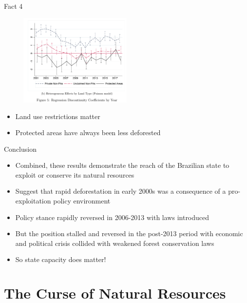 \documentclass[11pt,notes=hide,aspectratio=169,mathserif]{beamer}
\begin{document}
\begin{frame}{Fact 4}
\begin{figure}
\centering
\includegraphics[width=0.5\textwidth]{../TA9/inputs/fig_land_use.png}
\end{figure}
\begin{itemize}
\item Land use restrictions matter 
\item Protected areas have always been less deforested
\end{itemize}
\end{frame}

\begin{frame}{Conclusion}
\begin{itemize}
\item Combined, these results demonstrate the reach of the Brazilian state to exploit or conserve its natural resources
\item Suggest that rapid deforestation in early 2000s was a consequence of a pro-exploitation policy environment 
\item Policy stance rapidly reversed in 2006-2013 with laws introduced 
\item But the position stalled and reversed in the post-2013 period with economic and political crisis collided with weakened forest conservation laws 
\item So state capacity does matter!
\end{itemize}
\end{frame}

\section*{The Curse of Natural Resources}
\end{document}
